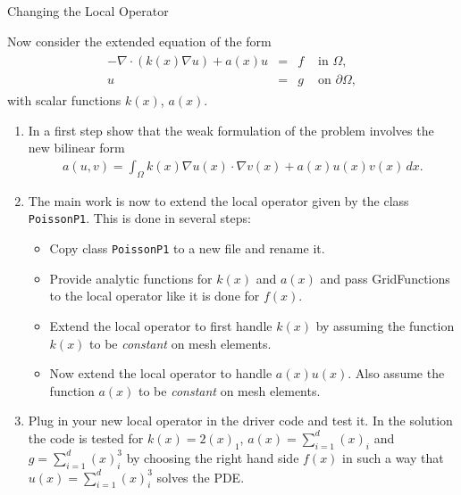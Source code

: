 \documentclass[12pt,a4paper]{article}
\begin{document}
\begin{Exercise}{Changing the Local Operator}

Now consider the extended equation of the form
\begin{align}
    \begin{array}{rcll}
      -\nabla\cdot (k(x) \nabla u) +a(x) u  & = & f & \text{ in } \Omega, \\
      u & = & g & \text{ on } \partial\Omega,
    \end{array}
\end{align}
with scalar functions $k(x)$, $a(x)$.

\begin{enumerate}
\item In a first step show that the weak formulation of the problem
  involves the new bilinear form
  \begin{align}
    a(u,v) = \int_\Omega k(x) \nabla u(x) \cdot \nabla v(x) + a(x) u(x) v(x) \,dx .
  \end{align}
\item The main work is now to extend the local operator given by the
  class \lstinline{PoissonP1}. This is done in several steps:
  \begin{itemize}
  \item Copy class \lstinline{PoissonP1} to a new file and rename it.
  \item Provide analytic functions for $k(x)$ and $a(x)$ and pass
    GridFunctions to the local operator like it is done for $f(x)$.
  \item Extend the local operator to first handle $k(x)$ by assuming the
    function $k(x)$ to be \emph{constant} on mesh elements.
  \item Now extend the local operator to handle $a(x) u(x)$. Also assume
    the function $a(x)$ to be \emph{constant} on mesh elements.
  \end{itemize}
\item Plug in your new local operator in the driver code and test it.
  In the solution the code is tested for $k(x)=2(x)_1$,
  $a(x)=\sum_{i=1}^{d}(x)_i$ and $g=\sum_{i=1}^d (x)_i^3$ by choosing
  the right hand side $f(x)$ in such a way that $u(x)=\sum_{i=1}^d
  (x)_i^3$ solves the PDE.
\end{enumerate}
\end{Exercise}



\end{document}
